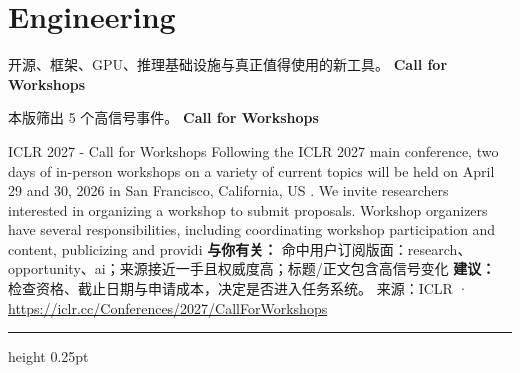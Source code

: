 \documentclass[10.5pt]{ctexart}
\begin{document}
\section*{Engineering}
{\color{ormuted} 开源、框架、GPU、推理基础设施与真正值得使用的新工具。}
\vspace{2mm}
{\LARGE\bfseries Call for Workshops}\par
\vspace{1mm}
{\color{ormuted} 本版筛出 5 个高信号事件。}
\vspace{3mm}
{\Large\bfseries Call for Workshops}\par
ICLR 2027 - Call for Workshops Following the ICLR 2027 main conference, two days of in-person workshops on a variety of current topics will be held on April 29 and 30, 2026 in San Francisco, California, US . We invite researchers interested in organizing a workshop to submit proposals. Workshop organizers have several responsibilities, including coordinating workshop participation and content, publicizing and providi
\textbf{与你有关：} 命中用户订阅版面：research、opportunity、ai；来源接近一手且权威度高；标题/正文包含高信号变化
\textbf{建议：} 检查资格、截止日期与申请成本，决定是否进入任务系统。
{\footnotesize\color{ormuted} 来源：ICLR · \url{https://iclr.cc/Conferences/2027/CallForWorkshops}}
\vspace{4mm}
\hrule height 0.25pt
\vspace{3mm}
\end{document}
